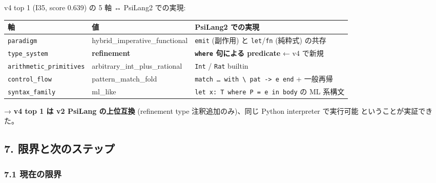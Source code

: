 \documentclass[
]{ltjsarticle}
\newcounter{none} %
\begin{document}
v4 top 1 (I35, score 0.639) の 5 軸 ↔ PsiLang2 での実現:

{\def\LTcaptype{none} %
\begin{longtable}[]{@{}
  >{\raggedright\arraybackslash}p{}
  >{\raggedright\arraybackslash}p{}
  >{\raggedright\arraybackslash}p{}@{}}
\toprule\noalign{}
\begin{minipage}[b]{\linewidth}\raggedright
軸
\end{minipage} & \begin{minipage}[b]{\linewidth}\raggedright
値
\end{minipage} & \begin{minipage}[b]{\linewidth}\raggedright
PsiLang2 での実現
\end{minipage} \\
\midrule\noalign{}
\endhead
\bottomrule\noalign{}
\endlastfoot
\texttt{paradigm} & hybrid\_imperative\_functional & \texttt{emit}
(副作用) と \texttt{let}/\texttt{fn} (純粋式) の共存 \\
\texttt{type\_system} & \textbf{refinement} & \textbf{\texttt{where}
句による predicate} ← v4 で新規 \\
\texttt{arithmetic\_primitives} & arbitrary\_int\_plus\_rational &
\texttt{Int} / \texttt{Rat} builtin \\
\texttt{control\_flow} & pattern\_match\_fold &
\texttt{match\ …\ with\ \textbackslash{}\textbar{}\ pat\ -\textgreater{}\ e\ end}
+ 一般再帰 \\
\texttt{syntax\_family} & ml\_like &
\texttt{let\ x:\ T\ where\ P\ =\ e\ in\ body} の ML 系構文 \\
\end{longtable}
}

→ \textbf{v4 top 1 は v2 PsiLang の上位互換} (refinement type
注釈追加のみ)、同じ Python interpreter で実行可能
ということが実証できた。

\subsection{7.
限界と次のステップ}\label{ux9650ux754cux3068ux6b21ux306eux30b9ux30c6ux30c3ux30d7}

\subsubsection{7.1 現在の限界}\label{ux73feux5728ux306eux9650ux754c}
\end{document}
